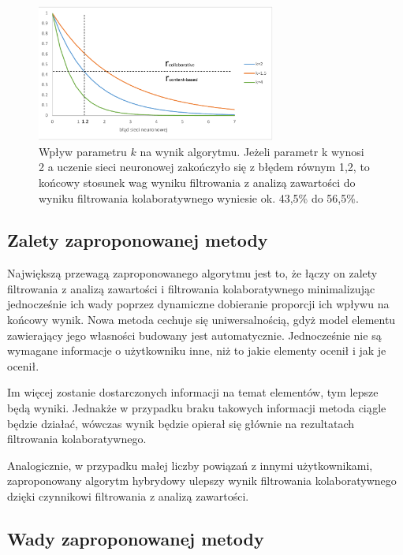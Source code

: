 \documentclass[twoside]{iisthesis}
\begin{document}
		 \begin{figure}[!ht] 
		 	\centering
		 	\includegraphics[width=0.7\textwidth]{hybridfunction}
		 	\caption{Wpływ parametru $k$ na wynik algorytmu. Jeżeli parametr k wynosi 2 a uczenie sieci neuronowej zakończyło się z błędem równym 1,2, to końcowy stosunek wag wyniku filtrowania z analizą zawartości do wyniku filtrowania kolaboratywnego wyniesie ok. 43,5\% do 56,5\%.}
		 	\label{fig:hybridfunction}
		 \end{figure}
	 
		 \subsection{Zalety zaproponowanej metody}
		 
		 Największą przewagą zaproponowanego algorytmu jest to, że łączy on zalety filtrowania z analizą zawartości i filtrowania kolaboratywnego minimalizując jednocześnie ich wady poprzez dynamiczne dobieranie proporcji ich wpływu na końcowy wynik. Nowa metoda cechuje się uniwersalnością, gdyż model elementu zawierający jego własności budowany jest automatycznie. Jednocześnie nie są wymagane informacje o użytkowniku inne, niż to jakie elementy ocenił i jak je ocenił. 
		 
		 Im więcej zostanie dostarczonych informacji na temat elementów, tym lepsze będą wyniki. Jednakże w przypadku braku takowych informacji metoda ciągle będzie działać,  wówczas wynik będzie opierał się głównie na rezultatach filtrowania kolaboratywnego.
		 
		 Analogicznie, w przypadku małej liczby powiązań z innymi użytkownikami, zaproponowany algorytm hybrydowy ulepszy wynik filtrowania kolaboratywnego dzięki czynnikowi filtrowania z analizą zawartości. 
		 
		 \subsection{Wady zaproponowanej metody}
		 
\end{document}

